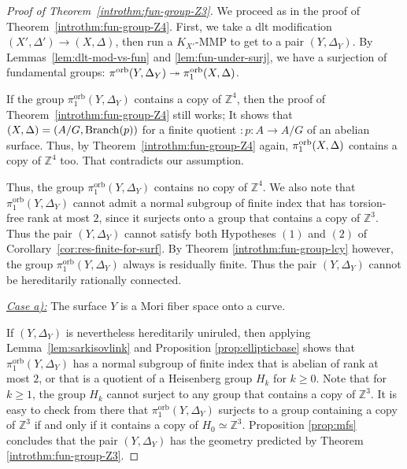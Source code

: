 \documentclass{amsart}
\newcommand{\zz}{\mathbb{Z}}
\theoremstyle{definition}
\theoremstyle{remark}
\numberwithin{equation}{section}
\begin{document}
\begin{proof}[Proof of Theorem~\ref{introthm:fun-group-Z3}]
We proceed as in the proof of Theorem~\ref{introthm:fun-group-Z4}. First, we take a dlt modification $(X',\Delta')\rightarrow (X,\Delta)$, then run a $K_{X'}$-MMP to get to a pair $(Y,\Delta_Y)$. By Lemmas~\ref{lem:dlt-mod-vs-fun} and \ref{lem:fun-under-surj}, we have a surjection of fundamental groups: 
$\pi^{\rm{orb}}(Y,\Delta_Y)\twoheadrightarrow\pi_1^{\rm{orb}}(X,\Delta)$.

If the group $\pi_1^{\mathrm{orb}}(Y,\Delta_Y)$ contains a copy of $\zz^4$, then the proof of Theorem~\ref{introthm:fun-group-Z4} still works; It shows that $(X,\Delta) =(A/G,{\rm Branch}(p))$ for a finite quotient $:p:A\to A/G$ of an abelian surface. Thus, by Theorem~\ref{introthm:fun-group-Z4} again, $\pi_1^{\rm orb}(X,\Delta)$ contains a copy of $\zz^4$ too. That contradicts our assumption.

Thus, the group $\pi_1^{\mathrm{orb}}(Y,\Delta_Y)$ contains no copy of $\zz^4$. We also note that $\pi_1^{\mathrm{orb}}(Y,\Delta_Y)$ cannot admit a normal subgroup of finite index that has torsion-free rank at most $2$, since it surjects onto a group that contains a copy of $\zz^3$. Thus the pair $(Y,\Delta_Y)$ cannot satisfy both Hypotheses $(1)$ and $(2)$ of Corollary~\ref{cor:res-finite-for-surf}. By Theorem \ref{introthm:fun-group-lcy} however, the group $\pi_1^{\mathrm{orb}}(Y,\Delta_Y)$ always is residually finite. Thus the pair $(Y,\Delta_Y)$ cannot be hereditarily rationally connected.

\medskip

\noindent\underline{\textit{Case a):}}
The surface $Y$ is a Mori fiber space onto a curve. 

\medskip

\noindent If $(Y,\Delta_Y)$ is nevertheless hereditarily uniruled, then applying Lemma~\ref{lem:sarkisovlink} and Proposition \ref{prop:ellipticbase} shows that $\pi_1^{\mathrm{orb}}(Y,\Delta_Y)$ has a normal subgroup of finite index that is abelian of rank at most $2$, or that is a quotient of a Heisenberg group $H_k$ for $k\ge 0$. Note that for $k\ge 1$, the group $H_k$ cannot surject to any group that contains a copy of $\zz^3$. It is easy to check from there that $\pi_1^{\mathrm{orb}}(Y,\Delta_Y)$ surjects to a group containing a copy of $\zz^3$ if and only if it contains a copy of $H_0\simeq \zz^3$. Proposition \ref{prop:mfs} concludes that the pair $(Y,\Delta_Y)$ has the geometry predicted by Theorem \ref{introthm:fun-group-Z3}.


\end{proof}
\end{document}

